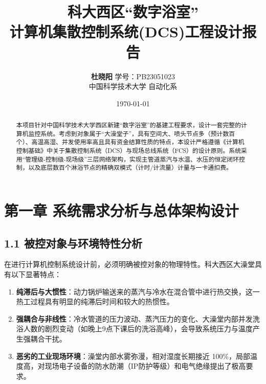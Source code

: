 \documentclass[11pt,a4paper,UTF8]{ctexart}
\title{\Huge\bfseries 科大西区“数字浴室”\\计算机集散控制系统(DCS)工程设计报告}
\author{\textbf{杜晓阳} \quad 学号：PB23051023 \\ \small 中国科学技术大学 自动化系}
\date{\today}
\begin{document}
\maketitle

\begin{abstract}
    本项目针对中国科学技术大学西区新建“数字浴室”的基建工程要求，设计一套完整的计算机监控系统。考虑到对象属于“大澡堂子”，具有空间大、喷头节点多（预计数百个）、高温高湿、并发使用率高且具有资金结算性质的特点，本设计严格遵循《计算机控制基础》中关于集散控制系统（DCS）与现场总线系统（FCS）的设计原则。系统采用“管理级-控制级-现场级”三层网络架构，实现主管道蒸汽与水温、水压的恒定闭环控制，以及底层数百个淋浴节点的精确双模式（计时/计流量）计量与一卡通扣费。
\end{abstract}

\clearpage

\section{第一章 系统需求分析与总体架构设计}

\subsection{1.1 被控对象与环境特性分析}
在进行计算机控制系统设计前，必须明确被控对象的物理特性。科大西区大澡堂具有以下显著特点：
\begin{enumerate}
    \item \textbf{纯滞后与大惯性}：动力锅炉输送来的蒸汽与冷水在混合管中进行热交换，这一热工过程具有明显的纯滞后时间和较大的热惯性。
    \item \textbf{强耦合与非线性}：冷水管道的压力波动、蒸汽压力的变化、大澡堂内部并发洗浴人数的剧烈变动（如晚上9点下课后的洗浴高峰），会导致系统压力与温度产生强耦合干扰。
    \item \textbf{恶劣的工业现场环境}：澡堂内部水雾弥漫，相对湿度长期接近 100\%，局部温度高，对现场电子设备的防水防潮（IP防护等级）和电气绝缘提出了极高要求。
\end{enumerate}
\end{document}
